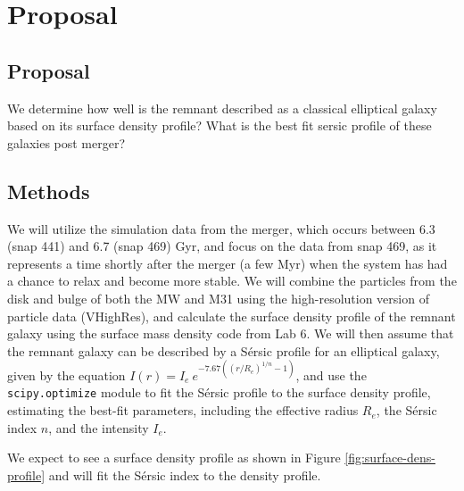 \documentclass[linenumbers,trackchanges]{aastex7}
\begin{document}
\section{Proposal}
\subsection{Proposal}
We determine how well is the remnant described as a classical elliptical galaxy based on its surface density profile? What is the best fit sersic profile of these galaxies post merger?

\subsection{Methods}

We will utilize the simulation data \citep{vandermarelM31VELOCITYVECTOR2012} from the merger, which occurs between 6.3 (snap 441) and 6.7 (snap 469) Gyr, and focus on the data from snap 469, as it represents a time shortly after the merger (a few Myr) when the system has had a chance to relax and become more stable. We will combine the particles from the disk and bulge of both the MW and M31 using the high-resolution version of particle data (VHighRes), and calculate the surface density profile of the remnant galaxy using the surface mass density code from Lab 6. We will then assume that the remnant galaxy can be described by a Sérsic profile for an elliptical galaxy, given by the equation $I(r) = I_e ~e^{-7.67 ( (r/R_e)^{1/n} - 1)}$, and use the \texttt{scipy.optimize} module to fit the Sérsic profile to the surface density profile, estimating the best-fit parameters, including the effective radius $R_e$, the Sérsic index $n$, and the intensity $I_e$.

We expect to see a surface density profile as shown in Figure \ref{fig:surface-dens-profile} and will fit the Sérsic index to the density profile.
\end{document}
